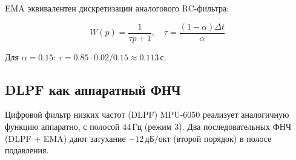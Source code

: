 EMA эквивалентен дискретизации аналогового RC-фильтра:

\begin{equation}
  W(p) = \frac{1}{\tau p + 1}, \quad \tau = \frac{(1-\alpha)\Delta t}{\alpha}
  \label{eq:ema_analog}
\end{equation}

Для $\alpha = 0.15$: $\tau = 0.85 \cdot 0.02 / 0.15 \approx 0.113\,\text{с}$.

\subsection{DLPF как аппаратный ФНЧ}

Цифровой фильтр низких частот (DLPF) MPU-6050 реализует
аналогичную функцию аппаратно, с полосой $44\,\text{Гц}$
(режим 3). Два последовательных ФНЧ (DLPF + EMA) дают
затухание $-12\,\text{дБ/окт}$ (второй порядок) в полосе
подавления.

